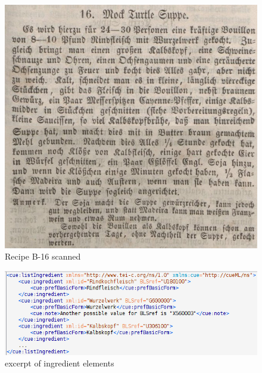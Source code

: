 \documentclass[12pt, twoside]{report}
\begin{document}
\newpage
\begin{figure}[H]
	\centering
	\includegraphics[width=1\textwidth]{Images/B-16}
	\caption{Recipe B-16 scanned \parencite{DTA}}
	\label{fig:B16Scanned}
\end{figure}

\begin{figure}[H]
	\centering
	\includegraphics[width=1\textwidth]{Images/ingredientList}
	\caption{excerpt of ingredient elements}
	\label{fig:ingredientList}
\end{figure}
\end{document}
